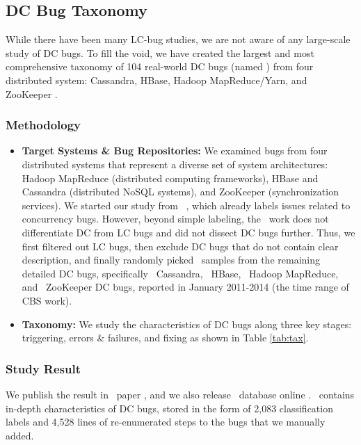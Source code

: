 \subsection{DC Bug Taxonomy}

While there have been many LC-bug studies, we are not aware of any large-scale
study of DC bugs. To fill the void, we have created the largest and most
comprehensive taxonomy of 104 real-world DC bugs (named \taxdc) from four
distributed system: Cassandra, HBase, Hadoop MapReduce/Yarn, and ZooKeeper
\cite{Leesatapornwongsa+16-TaxDC}.

\subsubsection{Methodology}



\begin{itemize}

\item {\bf Target Systems \& Bug Repositories:} We examined bugs from four
distributed systems that represent a diverse set of system architectures: Hadoop
MapReduce \cite{HadoopWeb} (distributed computing frameworks), HBase
\cite{HBaseWeb} and Cassandra \cite{CassandraWeb} (distributed NoSQL systems),
and ZooKeeper \cite{ZooKeeperWeb} (synchronization services).
%
We started our study from \cdb\ \cite{CBSWeb}, which already labels issues
related to concurrency bugs. However, beyond simple labeling, the \cbs\ work does
not differentiate DC from LC bugs and did not dissect DC bugs further.
Thus, we first filtered out LC bugs, then exclude DC bugs that do not contain
clear description, and finally randomly picked \numDcBugs\ samples from the
remaining detailed DC bugs, specifically \numDcCA\ Cassandra, \numDcHB\ HBase,
\numDcMR\ Hadoop MapReduce, and \numDcZK\ ZooKeeper DC bugs, reported in January
2011-2014 (the time range of CBS work).  

\item {\bf Taxonomy:} We study the characteristics of DC bugs along three key
stages: triggering, errors \& failures, and fixing as shown in Table \ref{tab:tax}.

\end{itemize}

\subsubsection{Study Result}

We publish the result in \taxdc\ paper \cite{Leesatapornwongsa+16-TaxDC}, and we
also release \taxdc\ database online \cite{CBSWeb}.  \taxdc\ contains in-depth
characteristics of DC bugs, stored in the form of 2,083 classification labels
and 4,528 lines of re-enumerated steps to the bugs that we manually added. 

